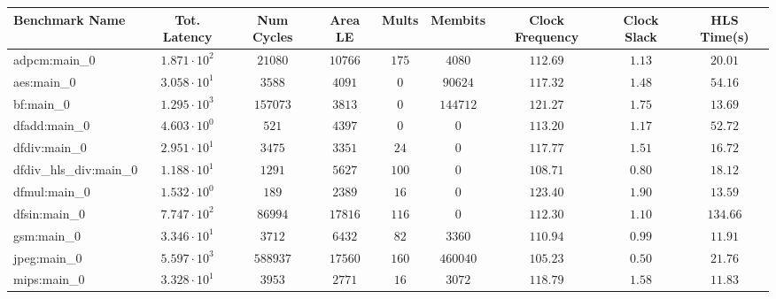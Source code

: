 \begin{tabular}{|l|c|c|c|c|c|c|c|c|}
\hline
Benchmark Name          & Tot. Latency           & Num Cycles  & Area LE   & Mults   & Membits    & Clock Frequency & Clock Slack & HLS Time(s) \\
\hline
adpcm:main\_0           & $ 1.871 \cdot 10^{2} $ & $ 21080   $ & $ 10766 $ & $ 175 $ & $ 4080   $ & $ 112.69      $ & $ 1.13    $ & $ 20.01   $ \\
aes:main\_0             & $ 3.058 \cdot 10^{1} $ & $ 3588    $ & $ 4091  $ & $ 0   $ & $ 90624  $ & $ 117.32      $ & $ 1.48    $ & $ 54.16   $ \\
bf:main\_0              & $ 1.295 \cdot 10^{3} $ & $ 157073  $ & $ 3813  $ & $ 0   $ & $ 144712 $ & $ 121.27      $ & $ 1.75    $ & $ 13.69   $ \\
dfadd:main\_0           & $ 4.603 \cdot 10^{0} $ & $ 521     $ & $ 4397  $ & $ 0   $ & $ 0      $ & $ 113.20      $ & $ 1.17    $ & $ 52.72   $ \\
dfdiv:main\_0           & $ 2.951 \cdot 10^{1} $ & $ 3475    $ & $ 3351  $ & $ 24  $ & $ 0      $ & $ 117.77      $ & $ 1.51    $ & $ 16.72   $ \\
dfdiv\_hls\_div:main\_0 & $ 1.188 \cdot 10^{1} $ & $ 1291    $ & $ 5627  $ & $ 100 $ & $ 0      $ & $ 108.71      $ & $ 0.80    $ & $ 18.12   $ \\
dfmul:main\_0           & $ 1.532 \cdot 10^{0} $ & $ 189     $ & $ 2389  $ & $ 16  $ & $ 0      $ & $ 123.40      $ & $ 1.90    $ & $ 13.59   $ \\
dfsin:main\_0           & $ 7.747 \cdot 10^{2} $ & $ 86994   $ & $ 17816 $ & $ 116 $ & $ 0      $ & $ 112.30      $ & $ 1.10    $ & $ 134.66  $ \\
gsm:main\_0             & $ 3.346 \cdot 10^{1} $ & $ 3712    $ & $ 6432  $ & $ 82  $ & $ 3360   $ & $ 110.94      $ & $ 0.99    $ & $ 11.91   $ \\
jpeg:main\_0            & $ 5.597 \cdot 10^{3} $ & $ 588937  $ & $ 17560 $ & $ 160 $ & $ 460040 $ & $ 105.23      $ & $ 0.50    $ & $ 21.76   $ \\
mips:main\_0            & $ 3.328 \cdot 10^{1} $ & $ 3953    $ & $ 2771  $ & $ 16  $ & $ 3072   $ & $ 118.79      $ & $ 1.58    $ & $ 11.83   $ \\

\end{tabular}
